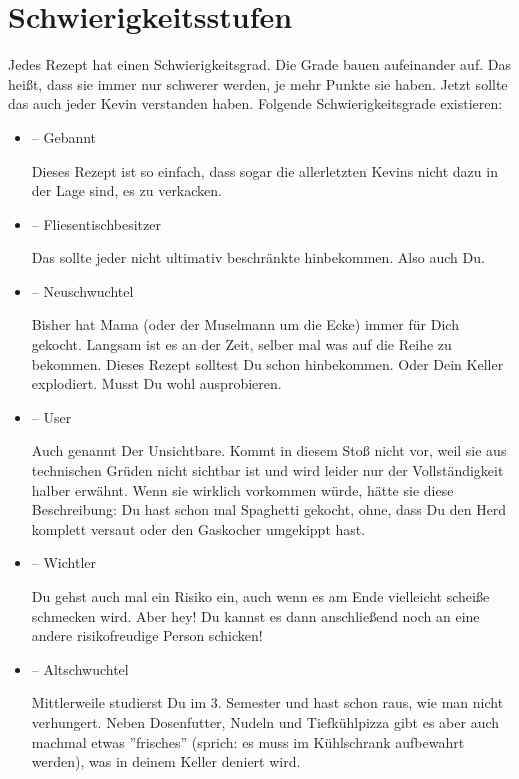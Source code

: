 \section{Schwierigkeitsstufen}
Jedes Rezept hat einen Schwierigkeitsgrad. Die Grade bauen aufeinander auf. Das heißt, dass sie immer nur schwerer werden, je mehr Punkte sie haben. Jetzt sollte das auch jeder Kevin verstanden haben.
Folgende Schwierigkeitsgrade existieren:
\noindent\begin{itemize}[leftmargin=*]
	\item[] \diffgebannt{} -- Gebannt

		Dieses Rezept ist so einfach, dass sogar die allerletzten Kevins nicht dazu in der Lage sind, es zu verkacken.

	\item[] \diffftb{} -- Fliesentischbesitzer

		Das sollte jeder nicht ultimativ beschränkte hinbekommen. Also auch Du.

	\item[] \diffneuschwuchtel{} -- Neuschwuchtel

		Bisher hat Mama (oder der Muselmann um die Ecke) immer für Dich gekocht. Langsam ist es an der Zeit, selber mal was auf die Reihe zu bekommen. Dieses Rezept solltest Du schon hinbekommen. Oder Dein Keller explodiert. Musst Du wohl ausprobieren.

	\item[] \diffuser{} -- User

		Auch genannt \glqq Der Unsichtbare\grqq. Kommt in diesem Stoß nicht vor, weil sie aus technischen Grüden nicht sichtbar ist und wird leider nur der Vollständigkeit halber erwähnt.  Wenn sie wirklich vorkommen würde, hätte sie diese Beschreibung: \glqq Du hast schon mal Spaghetti gekocht, ohne, dass Du den Herd komplett versaut oder den Gaskocher umgekippt hast.\grqq

	\item[] \diffwichtler{} -- Wichtler

		Du gehst auch mal ein Risiko ein, auch wenn es am Ende vielleicht scheiße schmecken wird. Aber hey! Du kannst es dann anschließend noch an eine andere risikofreudige Person schicken!

	\item[] \diffaltschwuchtel{} -- Altschwuchtel

		Mittlerweile studierst Du im 3. Semester und hast schon raus, wie man nicht verhungert. Neben Dosenfutter, Nudeln und Tiefkühlpizza gibt es aber auch machmal etwas ''frisches'' (sprich: es muss im  Kühlschrank aufbewahrt werden), was in deinem Keller deniert wird.


\end{itemize}
